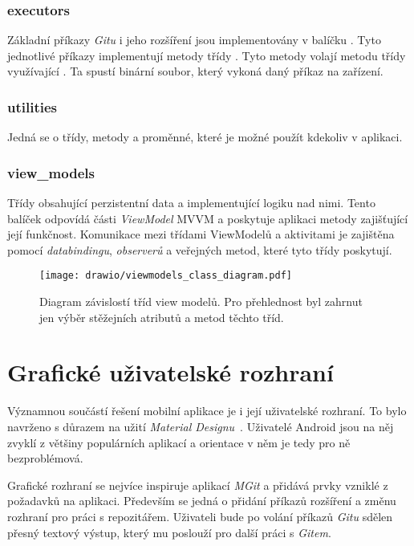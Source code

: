     \subsubsection{executors}
    Základní příkazy \emph{Gitu} i jeho rozšíření jsou implementovány v balíčku . Tyto jednotlivé příkazy implementují metody třídy . Tyto metody volají metodu  třídy  využívající . Ta spustí binární soubor, který vykoná daný příkaz na zařízení.

    \subsubsection{utilities}
    Jedná se o třídy, metody a proměnné, které je možné použít kdekoliv v aplikaci.

    \newpage
    \subsubsection{view\_models}
    Třídy obsahující perzistentní data a implementující logiku nad nimi. Tento balíček odpovídá části \emph{ViewModel} MVVM a poskytuje aplikaci metody zajišťující její funkčnost. Komunikace mezi třídami ViewModelů a aktivitami je zajištěna pomocí \emph{databindingu}, \emph{observerů} a veřejných metod, které tyto třídy poskytují.

    \begin{figure}[h]
        \centering
        \vspace{0.5cm}
        \texttt{[image: drawio/viewmodels\_class\_diagram.pdf]}
        \caption[Diagram závislostí tříd view modelů]{Diagram závislostí tříd view modelů. Pro přehlednost byl zahrnut jen výběr stěžejních atributů a metod těchto tříd.}
        \label{diagram:view_models}
    \end{figure}

\newpage
\section{Grafické uživatelské rozhraní}
Významnou součástí řešení mobilní aplikace je i její uživatelské rozhraní. To bylo navrženo s důrazem na užití \emph{Material Designu}~. Uživatelé Android jsou na něj zvyklí z většiny populárních aplikací a orientace v něm je tedy pro ně bezproblémová.

Grafické rozhraní se nejvíce inspiruje aplikací \emph{MGit} a přidává prvky vzniklé z požadavků na aplikaci. Především se jedná o přidání příkazů rozšíření a změnu rozhraní pro práci s repozitářem. Uživateli bude po volání příkazů \emph{Gitu} sdělen přesný textový výstup, který mu poslouží pro další práci s \emph{Gitem}. 

